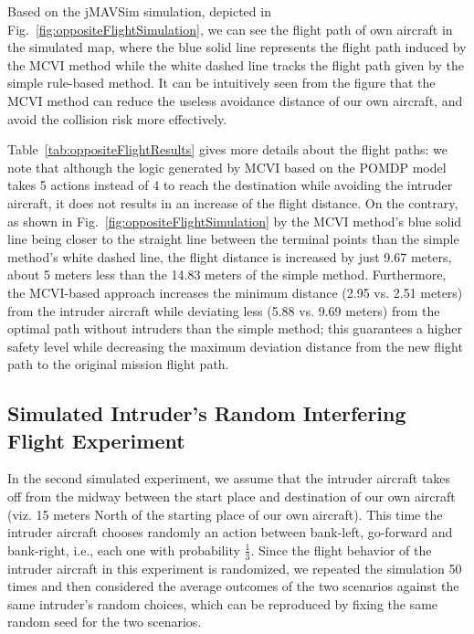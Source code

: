 \documentclass[orivec]{llncs}
\newcommand{\jMAVSim}{\textsf{jMAVSim}}
\begin{document}
Based on the \jMAVSim{} simulation, depicted in Fig.~\ref{fig:oppositeFlightSimulation}, we can see the flight path of own aircraft in the simulated map, where the blue solid line represents the flight path induced by the MCVI method while the white dashed line tracks the flight path given by the simple rule-based method. 
It can be intuitively seen from the figure that the MCVI method can reduce the useless avoidance distance of our own aircraft, and avoid the collision risk more effectively.

Table~\ref{tab:oppositeFlightResults} gives more details about the flight paths: 
we note that although the logic generated by MCVI based on the POMDP model takes 5 actions instead of 4 to reach the destination while avoiding the intruder aircraft, it does not results in an increase of the flight distance.
On the contrary, as shown in Fig.~\ref{fig:oppositeFlightSimulation} by the MCVI method's blue solid line being closer to the straight line between the terminal points than the simple method's white dashed line, the flight distance is increased by just 9.67 meters, about 5 meters less than the 14.83 meters of the simple method.
Furthermore, the MCVI-based approach increases the minimum distance (2.95 vs. 2.51 meters) from the intruder aircraft while deviating less (5.88 vs. 9.69 meters) from the optimal path without intruders than the simple method; 
this guarantees a higher safety level while decreasing the maximum deviation distance from the new flight path to the original mission flight path. 


\subsection{Simulated Intruder's Random Interfering Flight Experiment}
\label{ssec:randomInterferingFlight}

In the second simulated experiment, we assume that the intruder aircraft takes off from the midway between the start place and destination of our own aircraft (viz. 15 meters North of the starting place of our own aircraft). 
This time the intruder aircraft chooses randomly an action between bank-left, go-forward and bank-right, i.e., each one with probability $\frac{1}{3}$. 
Since the flight behavior of the intruder aircraft in this experiment is randomized, we repeated the simulation 50 times and then considered the average outcomes of the two scenarios against the same intruder's random choices, which can be reproduced by fixing the same random seed for the two scenarios. 
\end{document}
